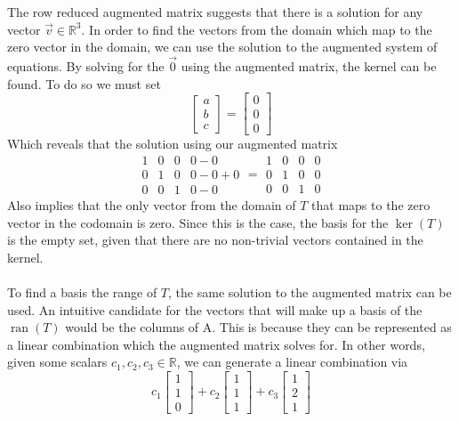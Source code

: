 \documentclass{report}
\begin{document}
The row reduced augmented matrix suggests that there is a solution for any vector $\vec{v}\in\mathbb{R}^3$.  In order to find the vectors from the domain which map to the zero vector in the domain,  we can use the solution to the augmented system of equations.  By solving for the $\vec{0}$ using the augmented matrix,  the kernel can be found.  To do so we must set
$$
\begin{bmatrix} a \\ b \\ c \end{bmatrix} = \begin{bmatrix} 0 \\ 0 \\ 0 \end{bmatrix}
$$
Which reveals that the solution using our augmented matrix
$$
\begin{array}{ccc|c}
	1 & 0 & 0 & 0 - 0 \\
	0 & 1 & 0 & 0 - 0 + 0 \\
	0 & 0 & 1 & 0 - 0
\end{array} =
\begin{array}{ccc|c}
	1 & 0 & 0 & 0 \\
	0 & 1 & 0 & 0\\
	0 & 0 & 1 & 0
\end{array}
$$
Also implies that the only vector from the domain of $T$ that maps to the zero vector in the codomain is zero.  Since this is the case,  the basis for the $\operatorname{ker}(T)$ is the empty set,  given that there are no non-trivial vectors contained in the kernel.  \\
\\
\noindent To find a basis the range of $T$,  the same solution to the augmented matrix can be used.  An intuitive candidate for the vectors that will make up a basis of the $\operatorname{ran}(T)$ would be the columns of A.  This is because they can be represented as a linear combination which the augmented matrix solves for.  In other words,  given some scalars $c_1,c_2,c_3\in\mathbb{R}$,  we can generate a linear combination via
$$
c_1\begin{bmatrix} 1 \\ 1 \\ 0 \end{bmatrix} + 
c_2\begin{bmatrix} 1 \\ 1 \\ 1 \end{bmatrix} + 
c_3\begin{bmatrix} 1 \\ 2 \\ 1 \end{bmatrix}
$$
\end{document}
